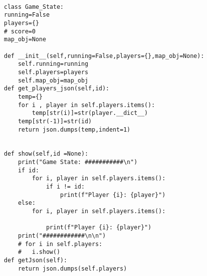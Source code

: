     \begin{lstlisting}[style=pythonstyle, caption=server game state class]

class Game_State:
running=False
players={}
# score=0
map_obj=None

def __init__(self,running=False,players={},map_obj=None):
    self.running=running
    self.players=players
    self.map_obj=map_obj
def get_players_json(self,id):
    temp={}
    for i , player in self.players.items():
        temp[str(i)]=str(player.__dict__)
    temp[str(-1)]=str(id)
    return json.dumps(temp,indent=1)
    

def show(self,id =None):
    print("Game State: ###########\n")
    if id:
        for i, player in self.players.items():
            if i != id:
                print(f"Player {i}: {player}") 
    else:
        for i, player in self.players.items():
            
            print(f"Player {i}: {player}")
    print("############\n\n")
    # for i in self.players:
    # 	i.show()
def getJson(self):
    return json.dumps(self.players)
        \end{lstlisting}

